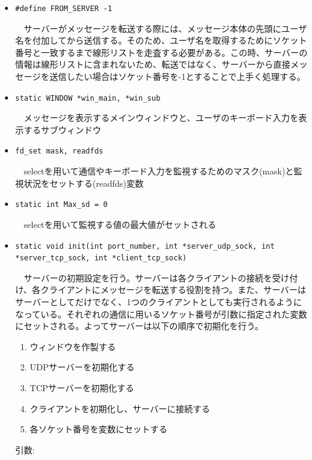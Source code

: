 \documentclass[uplatex,dvipdfmx,11pt,a4paper]{jsarticle} %
\begin{document}
\begin{itemize}
    \item {\tt \#define FROM\_SERVER -1}

        　サーバーがメッセージを転送する際には、メッセージ本体の先頭にユーザ名を付加してから送信する。そのため、ユーザ名を取得するためにソケット番号と一致するまで線形リストを走査する必要がある。この時、サーバーの情報は線形リストに含まれないため、転送ではなく、サーバーから直接メッセージを送信したい場合はソケット番号を-1とすることで上手く処理する。
        \newline

    \item {\tt static WINDOW *win\_main, *win\_sub}

        　メッセージを表示するメインウィンドウと、ユーザのキーボード入力を表示するサブウィンドウ
        \newline

    \item {\tt fd\_set mask, readfds}

        　selectを用いて通信やキーボード入力を監視するためのマスク(mask)と監視状況をセットする(readfds)変数
        \newline

    \item {\tt static int Max\_sd = 0}

        　selectを用いて監視する値の最大値がセットされる
        \newline

    \item {\tt static void init(int port\_number, int *server\_udp\_sock, int *server\_tcp\_sock, int *client\_tcp\_sock)}

        　サーバーの初期設定を行う。サーバーは各クライアントの接続を受け付け、各クライアントにメッセージを転送する役割を持つ。また、サーバーはサーバーとしてだけでなく、1つのクライアントとしても実行されるようになっている。それぞれの通信に用いるソケット番号が引数に指定された変数にセットされる。よってサーバーは以下の順序で初期化を行う。
        \begin{enumerate}
            \item ウィンドウを作製する
            \item UDPサーバーを初期化する
            \item TCPサーバーを初期化する
            \item クライアントを初期化し、サーバーに接続する
            \item 各ソケット番号を変数にセットする
        \end{enumerate}
        \begin{description}
            \item[引数:] \ 


\end{description}
\end{itemize}
\end{document}
